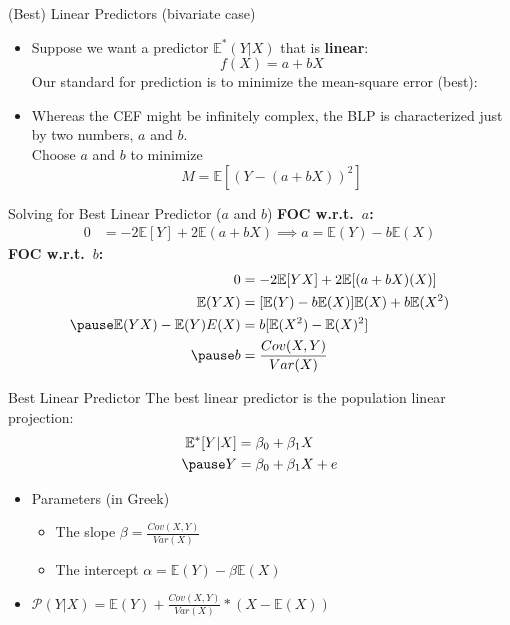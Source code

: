\documentclass[aspectratio=169, handout, t]{beamer}
\numberwithin{equation}{section}
\begin{document}
\begin{frame}{(Best) Linear Predictors (bivariate case)}

\begin{itemize}
\item Suppose we want a predictor $ \mathbb{E}^{*}(Y|X)$ that is \textbf{linear}:
$$f(X)=a+bX$$\pause
Our standard for prediction is to minimize the mean-square error (best): \\
\item Whereas the CEF might be infinitely complex, the BLP is characterized just by two numbers, $a$ and $b$.\\
\pause
Choose $a$ and $b$ to minimize
$$M= \mathbb{E}[(Y-(a+bX))^2]$$
\end{itemize}
\end{frame}

\begin{frame}{Solving for Best Linear Predictor ($a$ and $b$)}
\textbf{FOC w.r.t.\ $a$:}\pause
\begin{align*}
0&=  -2 \mathbb{E}[Y]+2 \mathbb{E}(a+bX) \implies a= \mathbb{E}(Y)-b \mathbb{E}(X)
\end{align*}
\pause
\textbf{FOC w.r.t.\ $b$:}\pause
\begin{align*}
0&= -2 \mathbb{E}[YX]+2 \mathbb{E}[(a+bX)(X)]\\
 \mathbb{E}(YX)&= [ \mathbb{E}(Y)-b \mathbb{E}(X)] \mathbb{E}(X)+b \mathbb{E}(X^2)\\\pause
 \mathbb{E}(YX)- \mathbb{E}(Y)E(X)&= b[ \mathbb{E}(X^2)- \mathbb{E}(X)^2]\\\pause
b&=\frac{Cov(X,Y)}{Var(X)}\\
\end{align*}
\end{frame}


\begin{frame}{Best Linear Predictor}
The best linear predictor is the population linear projection:
\begin{align*}
 \mathbb{E}^{*}[Y|X]&=\beta_0+\beta_1X\\ \pause
Y&=\beta_0+\beta_1X+e
\end{align*}
\pause
\begin{itemize}
\item Parameters (in Greek)
\begin{itemize}
\item The slope $\beta =\frac{Cov(X,Y)}{Var(X)}$
\item The intercept $\alpha=\mathbb{E}(Y)-\beta \mathbb{E}(X)$
\end{itemize}
\item $\mathcal{P}(Y|X)= \mathbb{E}(Y)+\frac{Cov(X,Y)}{Var(X)}*(X-\mathbb{E}(X))$
\end{itemize}
\end{frame}
\end{document}
